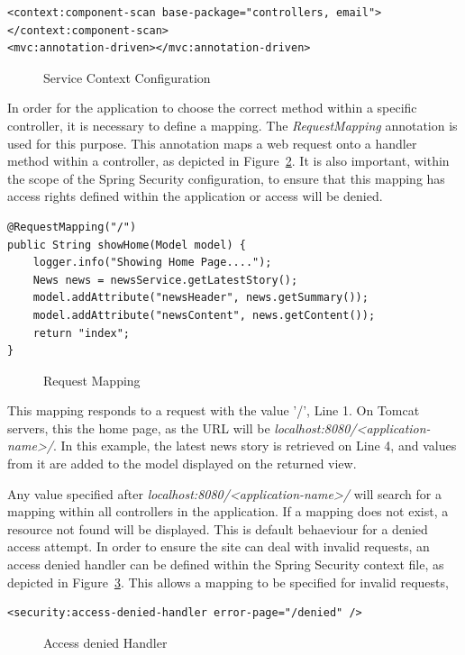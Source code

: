 \begin{lstlisting}
<context:component-scan base-package="controllers, email"></context:component-scan>
<mvc:annotation-driven></mvc:annotation-driven>
\end{lstlisting}
\begin{figure}[H]
\caption{Service Context Configuration}
\label{fig:dscomponent}
\end{figure}

In order for the application to choose the correct method within a specific controller, it is necessary to define a mapping. The \textit{RequestMapping} annotation is used for this purpose. This annotation maps a web request onto a handler method within a controller, as depicted in Figure~\ref{fig:requestmapping}. It is also important, within the scope of the Spring Security configuration, to ensure that this mapping has access rights defined within the application or access will be denied.

\begin{lstlisting}
@RequestMapping("/")
public String showHome(Model model) {
	logger.info("Showing Home Page....");
	News news = newsService.getLatestStory();
	model.addAttribute("newsHeader", news.getSummary());
	model.addAttribute("newsContent", news.getContent());
	return "index";
}
\end{lstlisting}
\begin{figure}[H]
\caption{Request Mapping}
\label{fig:requestmapping}
\end{figure}

This mapping responds to a request with the value '/', Line 1. On Tomcat servers, this the home page, as the URL will be \textit{localhost:8080/<application-name>/}. In this example, the latest news story is retrieved on Line 4, and values from it are added to the model displayed on the returned view.

Any value specified after \textit{localhost:8080/<application-name>/} will search for a mapping within all controllers in the application. If a mapping does not exist, a resource not found will be displayed. This is default behaeviour for a denied access attempt. In order to ensure the site can deal with invalid requests, an access denied handler can be defined within the Spring Security context file, as depicted in Figure~\ref{fig:accessDenied}. This allows a mapping to be specified for invalid requests,

\begin{lstlisting}
<security:access-denied-handler error-page="/denied" />
\end{lstlisting}
\begin{figure}[H]
\caption{Access denied Handler}
\label{fig:accessDenied}
\end{figure}


